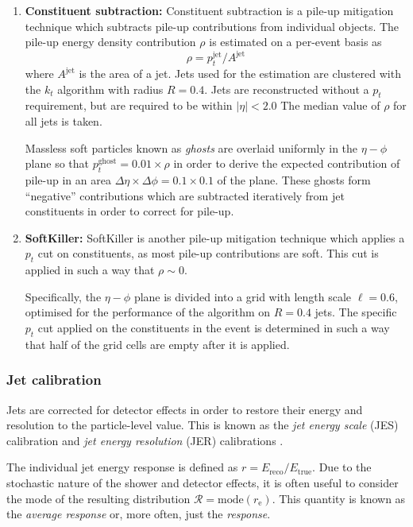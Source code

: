 \documentclass[10pt,a4paper]{book}
\begin{document}
\begin{enumerate}
\item \textbf{Constituent subtraction:} Constituent subtraction is a pile-up mitigation technique which subtracts pile-up contributions from individual objects. The pile-up energy density contribution $\rho$ is estimated on a per-event basis as
\begin{equation}
    \rho = p_t^{\text{jet}}/A^{\text{jet}}
\end{equation}
where $A^{\text{jet}}$ is the area of a jet. Jets used for the estimation are clustered with the $k_t$ algorithm with radius $R = 0.4$. Jets are reconstructed without a $p_t$ requirement, but are required to be within $\vert \eta \vert < 2.0$ The median value of $\rho$ for all jets is taken. 

Massless soft particles known as \emph{ghosts} are overlaid uniformly in the $\eta-\phi$ plane so that $p_t^{\text{ghost}} = 0.01 \times \rho$ in order to derive the expected contribution of pile-up in an area $\Delta \eta \times \Delta \phi = 0.1 \times 0.1$ of the plane. These ghosts form ``negative'' contributions which are subtracted iteratively from jet constituents in order to correct for pile-up. 

\item \textbf{SoftKiller:} SoftKiller is another pile-up mitigation technique which applies a $p_t$ cut on constituents, as most pile-up contributions are soft. This cut is applied in such a way that $\rho \sim 0$. 

Specifically, the $\eta-\phi$ plane is divided into a grid with length scale $\ell = 0.6$, optimised for the performance of the algorithm on $R = 0.4$ jets. The specific $p_t$ cut applied on the constituents in the event is determined in such a way that half of the grid cells are empty after it is applied.
\end{enumerate}

\subsubsection{Jet calibration}
Jets are corrected for detector effects in order to restore their energy and resolution to the particle-level value. This is known as the \emph{jet energy scale} (JES) calibration and \emph{jet energy resolution} (JER) calibrations \cite{ATLAS:2017bje, ATLAS:2020cli}.

The individual jet energy response is defined as $r = E_{\text{reco}}/E_{\text{true}}$. Due to the stochastic nature of the shower and detector effects, it is often useful to consider the mode of the resulting distribution $\mathcal{R} = \text{mode}(r_\text{e})$. This quantity is known as the \emph{average response} or, more often, just the \emph{response}. 
\end{document}
